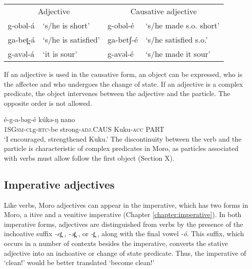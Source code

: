 \ea	\begin{tabular}[t]{llll}
	\multicolumn{2}{c}{Adjective} & \multicolumn{2}{c}{Causative adjective} \\
		{g-obəl-á} & ‘s/he is short’ & {g-obəl-é} & ‘s/he made s.o. short’\\
		{ga-bet̪-á} & ‘s/he is satisfied’ &  {ga-betʃ-é} &  ‘s/he satisfied s.o.’\\
g-avəl-á &	‘it is sour’ & 	g-avəl-é	& ‘s/he made it sour’\\
\end{tabular}
\z 

If an adjective is used in the causative form, an object can be expressed, who is the affectee and who undergoes the change of state. If an adjective is a complex predicate, the object intervenes between the adjective and the particle. The opposite order is not allowed. 

\ea \gll 	é-g-a-bəg-é 			kúkə-ŋ	nano\\
	1SG\textsc{sm}-\textsc{cl}g-\textsc{rtc}-be strong-\textsc{adj}.CAUS	Kuku-\textsc{acc}	PART\\
	\glt ‘I encouraged, strengthened Kuku.’ 
\z 
The discontinuity between the verb and the particle is characteristic of complex predicates in Moro, as particles associated with verbs must allow follow the first object (Section X). %



%

\subsection{Imperative adjectives}

Like verbs, Moro adjectives can appear in the imperative, which has two forms in Moro, a itive and a venitive imperative (Chapter \ref{chapter:imperative}). In both imperative forms, adjectives are distinguished from verbs by the presence of the inchoative suffix \textit{-et̪ }, \textit{-ət̪ }, or \textit{-t̪ }, along with the final vowel \textit{-ó}. This suffix, which occurs in a number of contexts besides the imperative, converts the stative adjective into an inchoative or change of state predicate. Thus, the imperative of ‘clean!’ would be better translated ‘become clean!'  

